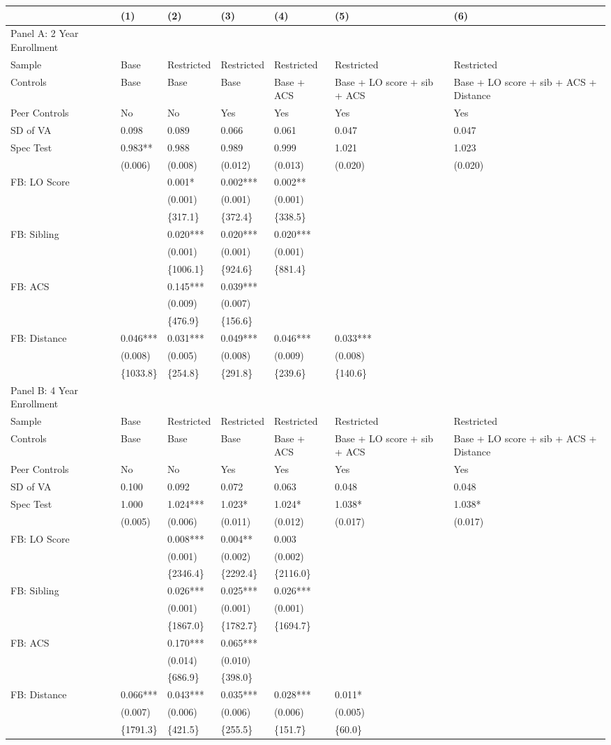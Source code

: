 \begin{table}[tbp] \centering
{}

{\footnotesize
\begin{tabularx}{\linewidth}{lCCCCCC}

\toprule
&{(1)}&{(2)}&{(3)}&{(4)}&{(5)}&{(6)} \tabularnewline
\midrule \addlinespace[\belowrulesep]
Panel A: 2 Year Enrollment&&&&&& \tabularnewline
\midrule Sample&Base&Restricted&Restricted&Restricted&Restricted&Restricted \tabularnewline
Controls&Base&Base&Base&Base + ACS&Base + LO score + sib + ACS&Base + LO score + sib + ACS + Distance \tabularnewline
Peer Controls&No&No&Yes&Yes&Yes&Yes \tabularnewline
\midrule SD of VA&0.098&0.089&0.066&0.061&0.047&0.047 \tabularnewline
Spec Test&0.983**&0.988&0.989&0.999&1.021&1.023 \tabularnewline
&(0.006)&(0.008)&(0.012)&(0.013)&(0.020)&(0.020) \tabularnewline
FB: LO Score&&0.001*&0.002***&0.002**&& \tabularnewline
&&(0.001)&(0.001)&(0.001)&& \tabularnewline
&&\{317.1\}&\{372.4\}&\{338.5\}&& \tabularnewline
FB: Sibling&&0.020***&0.020***&0.020***&& \tabularnewline
&&(0.001)&(0.001)&(0.001)&& \tabularnewline
&&\{1006.1\}&\{924.6\}&\{881.4\}&& \tabularnewline
FB: ACS&&0.145***&0.039***&&& \tabularnewline
&&(0.009)&(0.007)&&& \tabularnewline
&&\{476.9\}&\{156.6\}&&& \tabularnewline
FB: Distance&0.046***&0.031***&0.049***&0.046***&0.033***& \tabularnewline
&(0.008)&(0.005)&(0.008)&(0.009)&(0.008)& \tabularnewline
&\{1033.8\}&\{254.8\}&\{291.8\}&\{239.6\}&\{140.6\}& \tabularnewline
\midrule \midrule Panel B: 4 Year Enrollment&&&&&& \tabularnewline
\midrule Sample&Base&Restricted&Restricted&Restricted&Restricted&Restricted \tabularnewline
Controls&Base&Base&Base&Base + ACS&Base + LO score + sib + ACS&Base + LO score + sib + ACS + Distance \tabularnewline
Peer Controls&No&No&Yes&Yes&Yes&Yes \tabularnewline
\midrule SD of VA&0.100&0.092&0.072&0.063&0.048&0.048 \tabularnewline
Spec Test&1.000&1.024***&1.023*&1.024*&1.038*&1.038* \tabularnewline
&(0.005)&(0.006)&(0.011)&(0.012)&(0.017)&(0.017) \tabularnewline
FB: LO Score&&0.008***&0.004**&0.003&& \tabularnewline
&&(0.001)&(0.002)&(0.002)&& \tabularnewline
&&\{2346.4\}&\{2292.4\}&\{2116.0\}&& \tabularnewline
FB: Sibling&&0.026***&0.025***&0.026***&& \tabularnewline
&&(0.001)&(0.001)&(0.001)&& \tabularnewline
&&\{1867.0\}&\{1782.7\}&\{1694.7\}&& \tabularnewline
FB: ACS&&0.170***&0.065***&&& \tabularnewline
&&(0.014)&(0.010)&&& \tabularnewline
&&\{686.9\}&\{398.0\}&&& \tabularnewline
FB: Distance&0.066***&0.043***&0.035***&0.028***&0.011*& \tabularnewline
&(0.007)&(0.006)&(0.006)&(0.006)&(0.005)& \tabularnewline
&\{1791.3\}&\{421.5\}&\{255.5\}&\{151.7\}&\{60.0\}& \tabularnewline
\bottomrule 

\end{tabularx}
}
\end{table}
